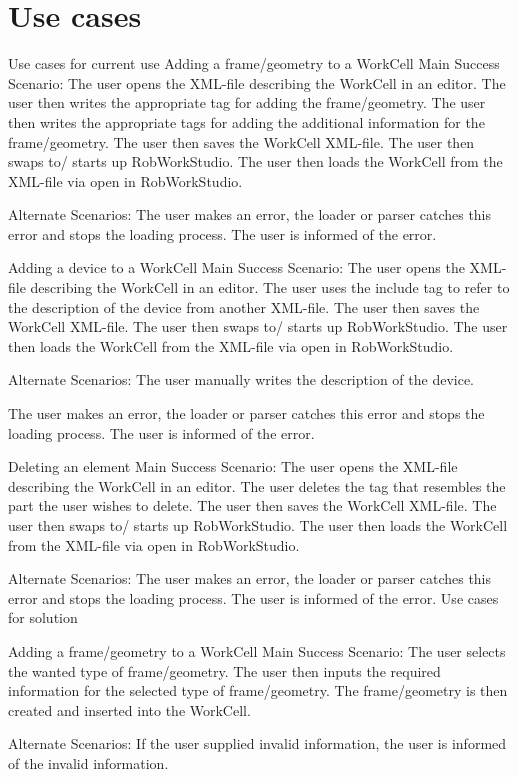 \section{Use cases}
\label{app:useCases}
Use cases for current use
Adding a frame/geometry to a WorkCell
Main Success Scenario: The user opens the XML-file describing the WorkCell in an editor. The user then writes the appropriate tag for adding the frame/geometry. The user then writes the appropriate tags for adding the additional information for the frame/geometry. The user then saves the WorkCell XML-file. The user then swaps to/ starts up RobWorkStudio. The user then loads the WorkCell from the XML-file via open in RobWorkStudio.

Alternate Scenarios:
The user makes an error, the loader or parser catches this error and stops the loading process. The user is informed of the error.


Adding a device to a WorkCell
Main Success Scenario: The user opens the XML-file describing the WorkCell in an editor. The user uses the include tag to refer to the description of the device from another XML-file. The user then saves the WorkCell XML-file. The user then swaps to/ starts up RobWorkStudio. The user then loads the WorkCell from the XML-file via open in RobWorkStudio.

Alternate Scenarios:
The user manually writes the description of the device.

The user makes an error, the loader or parser catches this error and stops the loading process. The user is informed of the error. 


Deleting an element
Main Success Scenario: The user opens the XML-file describing the WorkCell in an editor. 
The user deletes the tag that resembles the part the user wishes to delete. The user then saves the WorkCell XML-file. The user then swaps to/ starts up RobWorkStudio. The user then loads the WorkCell from the XML-file via open in RobWorkStudio.

Alternate Scenarios: 
The user makes an error, the loader or parser catches this error and stops the loading process. The user is informed of the error.
Use cases for solution

Adding a frame/geometry to a WorkCell
Main Success Scenario: The user selects the wanted type of frame/geometry. The user then inputs the required information for the selected type of frame/geometry. The frame/geometry is then created and inserted into the WorkCell.

Alternate Scenarios:
If the user supplied invalid information, the user is informed of the invalid information.

